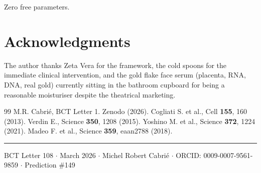 \documentclass[twocolumn,10pt]{article}
\begin{document}
Zero free parameters.

\section*{Acknowledgments}
The author thanks Zeta Vera for the framework, the cold spoons
for the immediate clinical intervention, and the gold flake
face serum (placenta, RNA, DNA, real gold) currently sitting
in the bathroom cupboard for being a reasonable moisturiser
despite the theatrical marketing.

\begin{thebibliography}{99}
 M.R. Cabri\'{e}, BCT Letter 1. Zenodo (2026).
 Cogliati S. et al., Cell \textbf{155}, 160 (2013).
 Verdin E., Science \textbf{350}, 1208 (2015).
 Yoshino M. et al., Science \textbf{372}, 1224 (2021).
 Madeo F. et al., Science \textbf{359}, eaan2788 (2018).
\end{thebibliography}

\vspace{8pt}\noindent\rule{\linewidth}{0.4pt}
\small BCT Letter 108 $\cdot$ March 2026 $\cdot$ Michel Robert Cabri\'{e}
$\cdot$ ORCID: 0009-0007-9561-9859 $\cdot$ Prediction \#149
\end{document}
